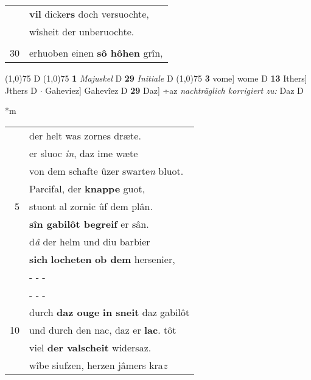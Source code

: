 \documentclass[8pt,a4paper,notitlepage]{article}
\begin{document}
\begin{table}[ht]
\begin{minipage}[t]{0.5\linewidth}
\begin{tabular}{rl}
 & \textbf{vil} dicke\textbf{rs} doch versuochte,\\ 
 & wîsheit der unberuochte.\\ 
 & \textit{\begin{large}D\end{large}}az ors unt \textbf{daz} pferdelîn\\ 
30 & erhuoben einen \textbf{sô hôhen} grîn,\\ 
\end{tabular}
\scriptsize
\line(1,0){75} \newline
D \newline
\line(1,0){75} \newline
\textbf{1} \textit{Majuskel} D  \textbf{29} \textit{Initiale} D  \newline
\line(1,0){75} \newline
\textbf{3} vome] wome D \textbf{13} Ithers] Jthers D  $\cdot$ Gaheviez] Gahevîez D \textbf{29} Daz] ÷az \textit{nachträglich korrigiert zu:} Daz D \newline
\end{minipage}
\hspace{0.5cm}
\begin{minipage}[t]{0.5\linewidth}
\small
\begin{center}*m
\end{center}
\begin{tabular}{rl}
 & der helt was zornes dræte.\\ 
 & er sluoc \textit{in}, daz ime wæte\\ 
 & von dem schafte ûzer swarte\textit{n} bluot.\\ 
 & Parcifal, der \textbf{knappe} guot,\\ 
5 & stuont al zornic ûf dem plân.\\ 
 & \textbf{sîn gabilôt begreif} er sân.\\ 
 & d\textit{â} der helm und diu barbier\\ 
 & \textbf{sich} \textbf{locheten} \textbf{ob dem} hersenier,\\ 
 & \multicolumn{1}{l}{ - - - }\\ 
 & \multicolumn{1}{l}{ - - - }\\ 
 & durch \textbf{daz ouge} \textbf{in sneit} daz gabilôt\\ 
10 & und durch den nac, daz er \textbf{lac}. tôt\\ 
 & viel \textbf{der valscheit} widersaz.\\ 
 & wîbe siufzen, herzen jâmers kra\textit{z}\\ 

\end{tabular}
\end{minipage}
\end{table}
\end{document}
